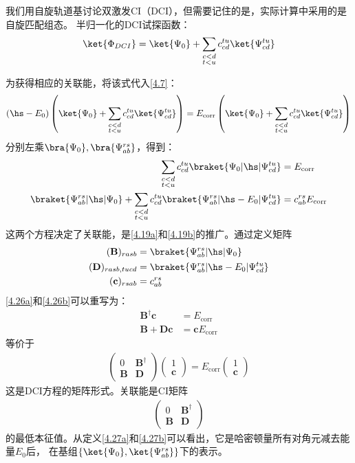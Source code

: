我们用自旋轨道基讨论双激发CI（DCI），但需要记住的是，实际计算中采用的是自旋匹配组态。
半归一化的DCI试探函数：
\begin{align}
	\ket{\Phi_{DCI}}=\ket{\Psi_0}+\sum_{\substack{c<d\\t<u}}c_{cd}^{tu}\ket{\Psi_{cd}^{tu}}
\end{align}

为获得相应的关联能，将该式代入\autoref{4.7}：
\begin{align}
	(\hs - E_0)\left(\ket{\Psi_0}+\sum_{\substack{c<d\\t<u}}c_{cd}^{tu}\ket{\Psi_{cd}^{tu}}\right)
	=E_{\text{corr}}\left(\ket{\Psi_0}+\sum_{\substack{c<d\\t<u}}c_{cd}^{tu}\ket{\Psi_{cd}^{tu}}\right)
\end{align}
分别左乘$\bra{\Psi_0},\bra{\Psi_{ab}^{rs}}$，得到：
\begin{align}
	\sum_{\substack{c<d\\t<u}}c_{cd}^{tu} \braket{\Psi_0|\hs|\Psi^{tu}_{cd}}&=E_{\text{corr}} \\
	\braket{\Psi^{rs}_{ab}|\hs|\Psi_0} + \sum_{\substack{c<d\\t<u}}c_{cd}^{tu} \braket{\Psi^{rs}_{ab}|\hs-E_0|\Psi^{tu}_{cd}}&=c_{ab}^{rs}E_{\text{corr}}
\end{align}
这两个方程决定了关联能，是\autoref{4.19a}和\autoref{4.19b}的推广。通过定义矩阵
\begin{align}
	(\mathbf{B})_{rasb}&=\braket{\Psi^{rs}_{ab}|\hs|\Psi_0}\\
	(\mathbf{D})_{rasb, tucd}&=\braket{\Psi^{rs}_{ab}|\hs-E_0|\Psi^{tu}_{cd}}\\
	(\mathbf{c})_{rsab}&=c_{ab}^{rs}
\end{align}
\autoref{4.26a}和\autoref{4.26b}可以重写为：
\begin{align}
	\mathbf{B}^\dagger\mathbf{c}&=E_{\text{corr}}\\
	\mathbf{B}+\mathbf{Dc}&=\mathbf{c}E_{\text{corr}}
\end{align}
等价于
\begin{align}
	\begin{pmatrix}
		0&\mathbf{B}^\dagger\\
		\mathbf{B}&\mathbf{D}
	\end{pmatrix}
	\begin{pmatrix}
		1\\
		\mathbf{c}
	\end{pmatrix}
	=E_{\text{corr}}
	\begin{pmatrix}
		1\\
		\mathbf{c}
	\end{pmatrix}
\end{align}
这是DCI方程的矩阵形式。关联能是CI矩阵
\begin{align}
	\begin{pmatrix}
		0&\mathbf{B}^\dagger\\
		\mathbf{B}&\mathbf{D}
	\end{pmatrix}
\end{align}
的最低本征值。从定义\autoref{4.27a}和\autoref{4.27b}可以看出，它是哈密顿量所有对角元减去\hft 能量$E_0$后，
在基组$\{\ket{\Psi_0}, \ket{\Psi_{ab}^{rs}}\}$下的表示。

